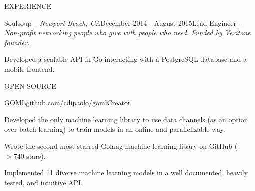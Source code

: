 \documentclass{resume} %
\begin{document}
\begin{rSection}{EXPERIENCE}
\begin{rSubsection}{Soulsoup -- {\it Newport Beach, CA}}{December 2014 - August 2015}{Lead Engineer -- {\sl Non-profit networking people who give with people who need. Funded by Veritone founder.}}

\item Developed a scalable API in Go interacting with a PostgreSQL database and a
    mobile frontend.
\end{rSubsection} 

\end{rSection}


\begin{rSection}{OPEN SOURCE}

\begin{rSubsection}{GOML}{\textsf{github.com/cdipaolo/goml}}{Creator}

\item Developed the only machine learning library to use data channels (as an option over batch learning) to train models in an online and parallelizable way.
\item Wrote the second most starred Golang machine learning libary on GitHub ($>740$ stars).
\item Implemented 11 diverse machine learning models in a well documented, heavily tested, and intuitive API.
\end{rSubsection}

\end{rSection}

\end{document}
